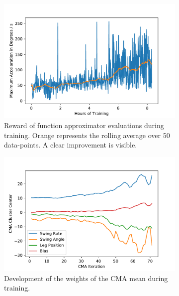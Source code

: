 \documentclass[11pt, a4paper]{article}
\begin{document}
	
	\begin{figure}[ht]
		\raggedright
		\begin{subfigure}{.48\textwidth}
			\centering
			\includegraphics[width=1\linewidth]{images/swing_rewards}
			\caption{Reward of function approximator evaluations during training. Orange represents the rolling average over 50 data-points. A clear improvement is visible.}
			\label{fig:swing_rewards}
		\end{subfigure}
		\begin{subfigure}{.48\textwidth}
			\centering
			\includegraphics[width=1\linewidth]{images/swing_weights}
			\caption{Development of the weights of the CMA mean during training.}
			\label{fig:swing_weights}
		\end{subfigure}
		\begin{subfigure}{.48\textwidth}
			\centering

\end{subfigure}
\end{figure}
\end{document}
